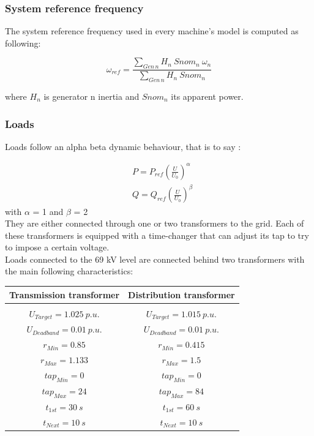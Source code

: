 \documentclass[a4paper, 12pt]{report}
\begin{document}
\subsubsection{System reference frequency}

The system reference frequency used in every machine's model is computed as following:

\[
 \omega_{ref} = \frac{\sum_{Gen \hspace{2pt} n} H_{n} \ Snom_{n} \ \omega_{n}}{\sum_{Gen \hspace{2pt} n} H_{n} \ Snom_{n}}
\]

where $H_{n}$ is generator n inertia and $Snom_{n}$ its apparent power.
\subsubsection{Loads}

Loads follow an alpha beta dynamic behaviour, that is to say :

\[
\begin{aligned}
& P = P_{ref} (\frac{U}{U_{0}})^\alpha \\
& Q = Q_{ref} (\frac{U}{U_{0}})^\beta
\end{aligned}
\]
with $\alpha$ = 1 and $\beta$ = 2 \\

They are either connected through one or two transformers to the grid. Each of these transformers is equipped with a time-changer that can adjust its tap to try to impose a certain voltage.  \\

Loads connected to the 69 kV level are connected behind two transformers with the main following characteristics:
\begin{center}
\begin{tabular}{c|c}
   \textbf{Transmission transformer} & \textbf{Distribution transformer}  \\
   \hline
   \\
   $U_{Target}=1.025 \ p.u. $ & $U_{Target}=1.015 \ p.u. $   \\
   $U_{Deadband}=0.01 \ p.u. $ & $U_{Deadband}=0.01 \ p.u. $   \\
   $r_{Min}=0.85 $ & $r_{Min}=0.415 $ \\
   $r_{Max}=1.133 $ & $r_{Max}=1.5 $ \\
   $tap_{Min}=0 $ & $tap_{Min}=0 $ \\
   $tap_{Max}=24 $ & $tap_{Max}=84 $ \\
   $t_{1st}=30 \ s $ & $t_{1st}=60 \ s $   \\
   $t_{Next}=10 \ s $ & $t_{Next}=10 \ s $   \\
\end{tabular}
\end{center}
\end{document}
